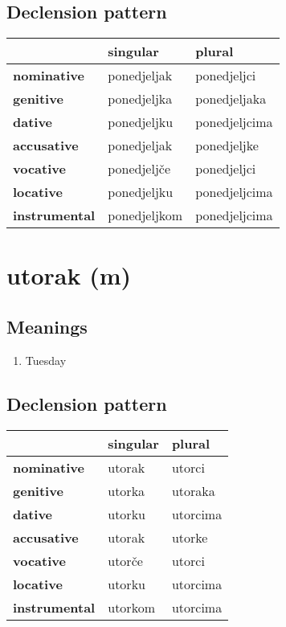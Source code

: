 \subsection*{Declension pattern}
\begin{tabularx}{\linewidth}{Xll}
\toprule
{} &      singular &         plural \\
\midrule
\textbf{nominative  } &   ponedjeljak &    ponedjeljci \\
\textbf{genitive    } &   ponedjeljka &   ponedjeljaka \\
\textbf{dative      } &   ponedjeljku &  ponedjeljcima \\
\textbf{accusative  } &   ponedjeljak &    ponedjeljke \\
\textbf{vocative    } &   ponedjeljče &    ponedjeljci \\
\textbf{locative    } &   ponedjeljku &  ponedjeljcima \\
\textbf{instrumental} &  ponedjeljkom &  ponedjeljcima \\
\bottomrule
\end{tabularx}

\filbreak
\section{utorak (m)}
\subsection*{Meanings}
\begin{enumerate}
\item Tuesday
\end{enumerate}
\subsection*{Declension pattern}
\begin{tabularx}{\linewidth}{Xll}
\toprule
{} & singular &    plural \\
\midrule
\textbf{nominative  } &   utorak &    utorci \\
\textbf{genitive    } &   utorka &   utoraka \\
\textbf{dative      } &   utorku &  utorcima \\
\textbf{accusative  } &   utorak &    utorke \\
\textbf{vocative    } &   utorče &    utorci \\
\textbf{locative    } &   utorku &  utorcima \\
\textbf{instrumental} &  utorkom &  utorcima \\
\bottomrule
\end{tabularx}

